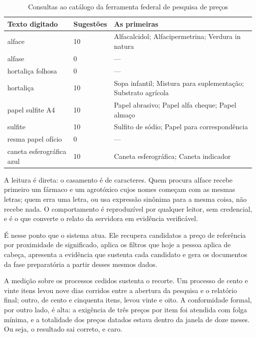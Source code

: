 \begin{table}[H]
  \centering
  \caption{Consultas ao catálogo da ferramenta federal de pesquisa de preços}
  \label{tab:consultas-catalogo}
  \begin{ufopaespacosimples}
  \small
  \begin{tabularx}{\textwidth}{@{}llX@{}}
    \toprule
    \textbf{Texto digitado} & \textbf{Sugestões} & \textbf{As primeiras} \\
    \midrule
    alface & 10 & Alfacalcidol; Alfacipermetrina; Verdura in natura \\
    alfase & 0 & --- \\
    hortaliça folhosa & 0 & --- \\
    hortaliça & 10 & Sopa infantil; Mistura para suplementação; Substrato
      agrícola \\
    papel sulfite A4 & 10 & Papel abrasivo; Papel alfa cheque; Papel almaço \\
    sulfite & 10 & Sulfito de sódio; Papel para correspondência \\
    resma papel ofício & 0 & --- \\
    caneta esferográfica azul & 10 & Caneta esferográfica; Caneta indicador \\
    \bottomrule
  \end{tabularx}
  \end{ufopaespacosimples}
\end{table}

A leitura é direta: o casamento é de caracteres. Quem procura alface recebe
primeiro um fármaco e um agrotóxico cujos nomes começam com as mesmas letras;
quem erra uma letra, ou usa expressão sinônima para a mesma coisa, não recebe
nada. O comportamento é reproduzível por qualquer leitor, sem credencial, e é o
que converte o relato da servidora em evidência verificável.

É nesse ponto que o sistema atua. Ele recupera candidatos a preço de referência
por proximidade de significado, aplica os filtros que hoje a pessoa aplica de
cabeça, apresenta a evidência que sustenta cada candidato e gera os documentos
da fase preparatória a partir desses mesmos dados.

A medição sobre os processos cedidos sustenta o recorte. Um processo de cento e
vinte itens levou nove dias corridos entre a abertura da pesquisa e o relatório
final; outro, de cento e cinquenta itens, levou vinte e oito. A conformidade
formal, por outro lado, é alta: a exigência de três preços por item foi atendida
com folga mínima, e a totalidade dos preços datados estava dentro da janela de
doze meses. Ou seja, o resultado sai correto, e caro.

